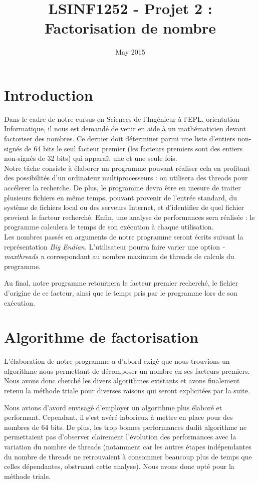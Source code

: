 \documentclass{article}
\title{LSINF1252 - Projet 2 : Factorisation de nombre}
\author{}
\date{May 2015}
\begin{document}


\section{Introduction}
Dans le cadre de notre cursus en Sciences de l'Ingénieur à l'EPL, orientation Informatique, 
il nous est demandé de venir en aide à un mathématicien devant factoriser des nombres. 
Ce dernier doit déterminer parmi une liste d'entiers non-signés de 64 bits le seul facteur
premier (les facteurs premiers sont des entiers non-signés de 32 bits) qui apparaît une 
et une seule fois.\\

\hspace{1cm}Notre tâche consiste à élaborer un programme pouvant réaliser cela en profitant
 des possibilités d'un ordinateur multiprocesseurs : on utilisera des threads pour accélerer
 la recherche. De plus, le programme devra être en mesure de traiter plusieurs fichiers en
 même temps, pouvant provenir de l'entrée standard, du système de fichiers local ou des serveurs
 Internet, et d'identifier de quel fichier provient le facteur recherché. Enfin, une analyse de
 performances sera réalisée : le programme calculera le temps de son exécution à chaque utilisation.\\

\hspace{1cm}Les nombres passés en arguments de notre programme seront écrits suivant la représentation
\emph{Big Endian}. L'utilisateur pourra faire varier une option \emph{-maxthreads n} correspondant
au nombre maximum de threads de calculs du programme.

\hspace{1cm}Au final, notre programme retournera le facteur premier recherché, le fichier d'origine
 de ce facteur, ainsi que le temps pris par le programme lors de son exécution.

\section{Algorithme de factorisation}
L'élaboration de notre programme a d'abord exigé que nous 
trouvions un algorithme nous permettant de décomposer un nombre en ses facteurs premiers. Nous
 avons donc cherché les divers algorithmes existants et avons finalement retenu la méthode 
triale pour diverses raisons qui seront explicitées par la suite.

\hspace{1cm}Nous avions d'avord envisagé d'employer un algorithme plus élaboré et performant.
 Cependant, il s'est avéré laborieux à mettre en place pour des nombres de 64 bits. De plus,
 les trop bonnes performances dudit algorithme ne permettaient pas d'observer clairement 
l'évolution des performances avec la variation du nombre de threads (notamment car les autres
 étapes indépendantes du nombre de threads ne retrouvaient à consommer beaucoup plus de temps
 que celles dépendantes, obstruant cette analyse). Nous avons donc opté pour la méthode triale.
\\
\end{document}
